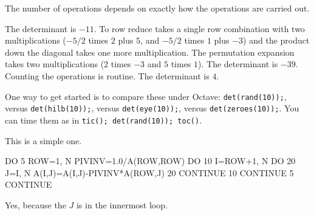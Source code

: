 \begin{ans}{2}
       The number of operations depends on exactly how the operations
       are carried out.
       \begin{exparts}
         \partsitem The determinant is $-11$.
           To row reduce takes a single row combination
           with two multiplications
           ($-5/2$ times $2$ plus $5$, and $-5/2$ times $1$ plus $-3$)
           and the product down the diagonal takes one more multiplication.
           The permutation expansion takes two multiplications ($2$ times
           $-3$ and $5$ times $1$).
         \partsitem The determinant is $-39$.
           Counting the operations is routine.
         \partsitem The determinant is $4$.
       \end{exparts}
     
\end{ans}
\begin{ans}{3}
      One way to get started is to compare these under Octave:
      \texttt{det(rand(10));}, versus
      \texttt{det(hilb(10));}, versus
      \texttt{det(eye(10));}, versus
      \texttt{det(zeroes(10));}.
      You can time them as in \texttt{tic(); det(rand(10)); toc()}.
    
\end{ans}
\begin{ans}{4}
      This is a simple one.
\begin{computercode}
DO 5 ROW=1, N
   PIVINV=1.0/A(ROW,ROW)
   DO 10 I=ROW+1, N
      DO 20 J=I, N
         A(I,J)=A(I,J)-PIVINV*A(ROW,J)
      20 CONTINUE
   10 CONTINUE
5 CONTINUE
\end{computercode}
    
\end{ans}
\begin{ans}{5}
      Yes, because the $J$ is in the innermost loop.
    
\end{ans}

